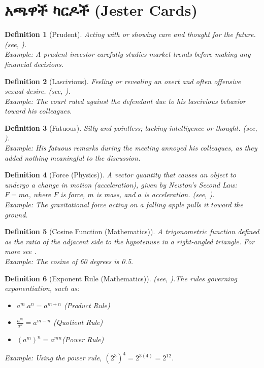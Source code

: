 \documentclass[a4paper,12pt]{article}
\newenvironment{geez}{\geezfont}{}
\theoremstyle{mystyle}
\newtheorem{definition}{Definition}
\numberwithin{equation}{section}
\numberwithin{theorem}{section}
\numberwithin{proposition}{section}
\numberwithin{example}{section}
\numberwithin{remark}{section}
\numberwithin{lemma}{section}
\numberwithin{corollary}{section}
\numberwithin{definition}{section}
\numberwithin{amharicdefinition}{section}
\begin{document}
\section{\begin{geez}አጫዋች ካርዶች (Jester Cards)\end{geez}}
\label{S:2}
\begin{definition}[Prudent]Acting with or showing care and thought for the future. (see, \cite{dictionary2002merriam}).\\
Example: A prudent investor carefully studies market trends before making any financial decisions.
\end{definition}
\begin{definition}[Lascivious]Feeling or revealing an overt and often offensive sexual desire.  (see,  \cite{dictionary1989oxford}).\\
Example: The court ruled against the defendant due to his lascivious behavior toward his colleagues.
\end{definition}
\begin{definition}[Fatuous]Silly and pointless; lacking intelligence or thought. (see, \cite{dictionary2002merriam}).\\
Example: His fatuous remarks during the meeting annoyed his colleagues, as they added nothing meaningful to the discussion.
\end{definition}
\begin{definition}[Force (Physics)]A vector quantity that causes an object to undergo a change in motion (acceleration), given by Newton's Second Law: $F=ma$, where $F$ is force, $m$ is mass, and $a$ is acceleration.  (see, \cite{serway2018current}).\\
Example: The gravitational force acting on a falling apple pulls it toward the ground.
\end{definition}
\begin{definition}[Cosine Function (Mathematics)] A trigonometric function defined as the ratio of the adjacent side to the hypotenuse in a right-angled triangle. For more see \cite{stewart2012calculus}.\\
Example: The cosine of 60 degrees is 0.5.
\end{definition}
\begin{definition}[Exponent Rule (Mathematics)] (see, \cite{wilczynski1916college}).The rules governing exponentiation, such as:
\begin{itemize}
\item $a^m.a^n=a^{m+n}$ (Product Rule)
\item $\frac{a^m}{a^n}=a^{m-n}$ (Quotient Rule)
\item $(a^m)^n=a^{mn}$(Power Rule)
\end{itemize}
Example: Using the power rule, $(2^3)^4=2^{3(4)}=2^{12}$.
\end{definition}
\end{document}
